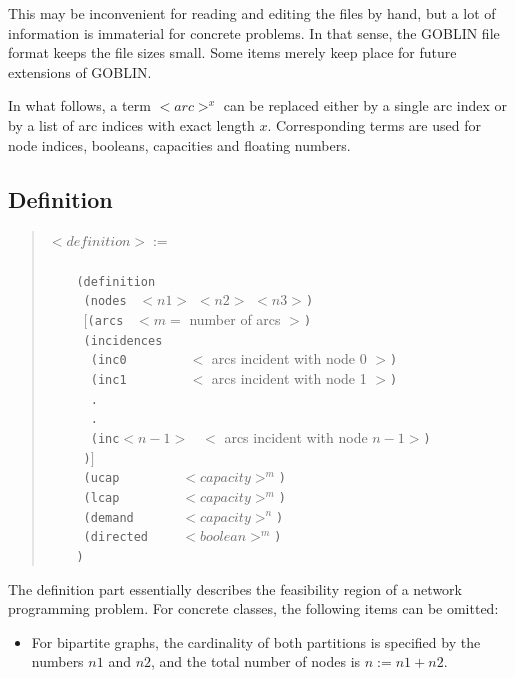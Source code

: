 \documentclass[a4paper,11pt,twoside]{book}
\begin{document}
\begin{multicols}{2}
This may be inconvenient for reading and editing the files by hand, but a lot
of information is immaterial for concrete problems. In that sense, the GOBLIN
file format keeps the file sizes small.
Some items merely keep place for future extensions of GOBLIN.

In what follows, a term $<arc>^x$ can be replaced either by a single
arc index or by a list of arc indices with exact length $x$. Corresponding
terms are used for node indices, booleans, capacities and floating numbers.


\newpage
\subsection{Definition}
\begin{quote}
$<definition> :=$\verb/    /\\
\verb/    /\\
\verb/    (definition/\\
\verb/     (nodes / $<n1>$ $<n2>$ $<n3>$\verb/)/\\
\verb/     /$[$\verb/(arcs / $<m=$ number of arcs $>$\verb/)/\\
\verb/     (incidences/\\
\verb/      (inc0        / $<$ arcs incident with node 0 $>$\verb/)/\\
\verb/      (inc1        / $<$ arcs incident with node 1 $>$\verb/)/\\
\verb/      ./\\
\verb/      ./\\
\verb/      (inc/$<n-1>$\verb/ / $<$ arcs incident with node $n-1 >$\verb/)/\\
\verb/     )/$]$\\
\verb/     (ucap        / $<capacity>^m$\verb/)/\\
\verb/     (lcap        / $<capacity>^m$\verb/)/\\
\verb/     (demand      / $<capacity>^n$\verb/)/\\
\verb/     (directed    / $<boolean>^m$\verb/)/\\
\verb/    )/\\
\end{quote}
The definition part essentially describes the feasibility region of a network
programming problem. For concrete classes, the following items can be omitted:
\begin{itemize}
\item For bipartite graphs, the cardinality of both partitions is specified by
    the numbers $n1$ and $n2$, and the total number of nodes is $n:=n1+n2$.

\end{itemize}
\end{multicols}
\end{document}
